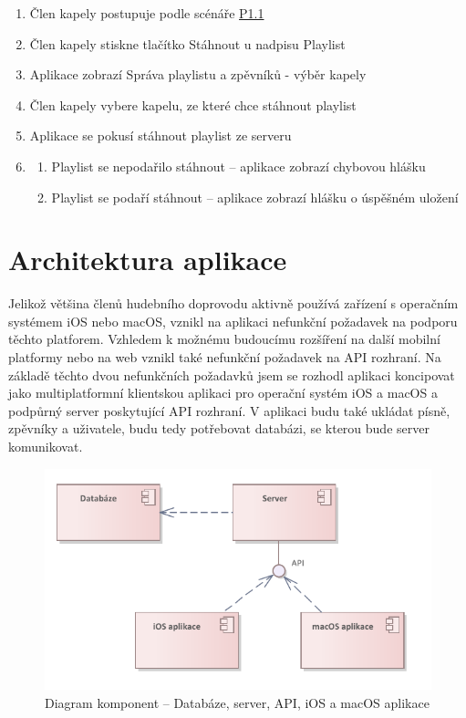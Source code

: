 \begin{enumerate}
    \item Člen kapely postupuje podle scénáře \hyperref[P1.1]{P1.1}
    \item Člen kapely stiskne tlačítko Stáhnout u nadpisu Playlist
    \item Aplikace zobrazí Správa playlistu a zpěvníků - výběr kapely
    \item Člen kapely vybere kapelu, ze které chce stáhnout playlist
    \item Aplikace se pokusí stáhnout playlist ze serveru
    \item \begin{enumerate}
        \item Playlist se nepodařilo stáhnout -- aplikace zobrazí chybovou hlášku
        \item Playlist se podaří stáhnout -- aplikace zobrazí hlášku o úspěšném uložení
    \end{enumerate}
\end{enumerate}

\section{Architektura aplikace}

Jelikož většina členů hudebního doprovodu aktivně používá zařízení s operačním systémem iOS nebo macOS, vznikl na aplikaci nefunkční požadavek na podporu těchto platforem. Vzhledem k možnému budoucímu rozšíření na další mobilní platformy nebo na web vznikl také nefunkční požadavek na API rozhraní. Na základě těchto dvou nefunkčních požadavků jsem se rozhodl aplikaci koncipovat jako multiplatformní klientskou aplikaci pro operační systém iOS a macOS a podpůrný server poskytující API rozhraní. V aplikaci budu také ukládat písně, zpěvníky a uživatele, budu tedy potřebovat databázi, se kterou bude server komunikovat.

\begin{figure}
    \includegraphics[width=\textwidth]{images/3-navrh/3-4-diagram-komponent.pdf}
    \caption[Diagram komponent aplikace]{Diagram komponent -- Databáze, server, API, iOS a macOS aplikace}
\end{figure}

